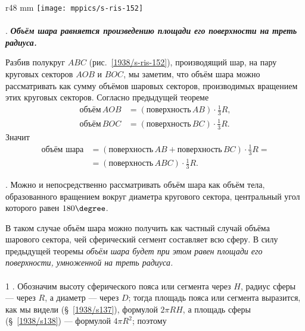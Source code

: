 \begin{wrapfigure}{r}{48 mm}
\vskip-0mm
\centering
\texttt{[image: mppics/s-ris-152]}
\caption{}\label{1938/s-ris-152}
\vskip-0mm
\end{wrapfigure}

\paragraph{}\label{1938/s144}
\mbox{.}
\textbf{\emph{Объём шара равняется произведению площади его поверхности на треть радиуса.}}

Разбив полукруг $ABC$ (рис.~\ref{1938/s-ris-152}), производящий шар, на пару круговых секторов $AOB$ и $BOC$, мы заметим, что объём шара можно рассматривать как сумму объёмов шаровых секторов, производимых вращением этих круговых секторов.
Согласно предыдущей теореме
\begin{align*}
\text{объём}\, AOB &= (\text{поверхность}\, AB)\cdot \tfrac13 R,
\\
\text{объём}\, BOC &= (\text{поверхность}\, BC) \cdot \tfrac13 R.
\end{align*}
Значит
\begin{align*}
\text{объём шара} &= (\text{поверхность}\, AB+\text{поверхность}\, BC)\cdot \tfrac13 R=
\\
&=(\text{поверхность}\, ABC)\cdot \tfrac13 R.
\end{align*}

{\small
\medskip

.
Можно и непосредственно рассматривать объём шара как объём тела, образованного вращением вокруг диаметра кругового сектора, центральный угол которого равен $180\degree$.

В таком случае объём шара можно получить как частный случай объёма шарового сектора, чей сферический сегмент составляет всю сферу.
В силу предыдущей теоремы \emph{объём шара будет при этом равен площади его поверхности, умноженной на треть радиуса.}

}

\paragraph{}\label{1938/s145}
 1 .
Обозначим высоту сферического пояса или сегмента через $H$, радиус сферы — через $R$, а диаметр — через $D$;
тогда площадь пояса или сегмента выразится, как мы видели (§~\ref{1938/s137}), формулой $2\pi RH$, а площадь сферы (§~\ref{1938/s138}) — формулой $4\pi R^2$;
поэтому

